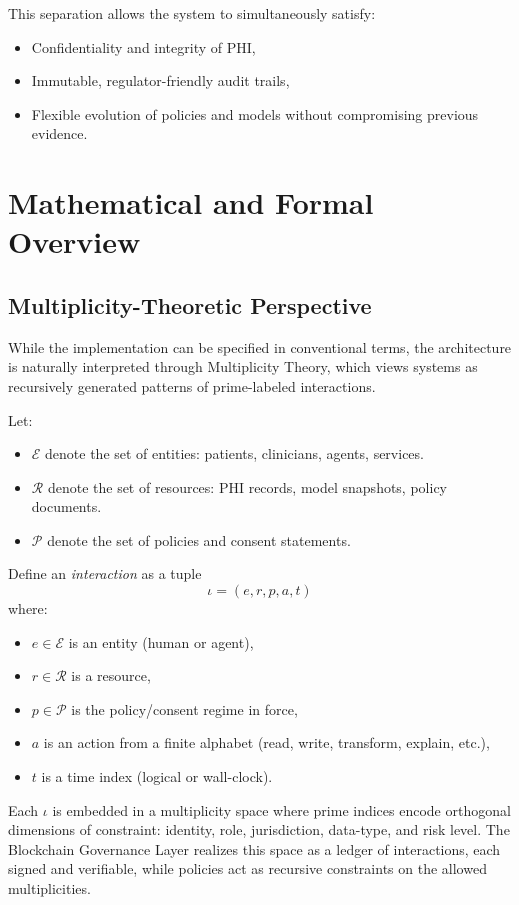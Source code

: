 \documentclass[11pt]{article}
\begin{document}
This separation allows the system to simultaneously satisfy:
\begin{itemize}[nosep]
  \item Confidentiality and integrity of PHI,
  \item Immutable, regulator-friendly audit trails,
  \item Flexible evolution of policies and models without compromising previous evidence.
\end{itemize}

\section{Mathematical and Formal Overview}

\subsection{Multiplicity-Theoretic Perspective}

While the implementation can be specified in conventional terms, the architecture is naturally interpreted through Multiplicity Theory, which views systems as recursively generated patterns of prime-labeled interactions.

Let:
\begin{itemize}[nosep]
  \item $\mathcal{E}$ denote the set of entities: patients, clinicians, agents, services.
  \item $\mathcal{R}$ denote the set of resources: PHI records, model snapshots, policy documents.
  \item $\mathcal{P}$ denote the set of policies and consent statements.
\end{itemize}

Define an \emph{interaction} as a tuple
\[
  \iota = (e, r, p, a, t)
\]
where:
\begin{itemize}[nosep]
  \item $e \in \mathcal{E}$ is an entity (human or agent),
  \item $r \in \mathcal{R}$ is a resource,
  \item $p \in \mathcal{P}$ is the policy/consent regime in force,
  \item $a$ is an action from a finite alphabet (read, write, transform, explain, etc.),
  \item $t$ is a time index (logical or wall-clock).
\end{itemize}

Each $\iota$ is embedded in a multiplicity space where prime indices encode orthogonal dimensions of constraint: identity, role, jurisdiction, data-type, and risk level. 
The Blockchain Governance Layer realizes this space as a ledger of interactions, each signed and verifiable, while policies act as recursive constraints on the allowed multiplicities.
\end{document}
